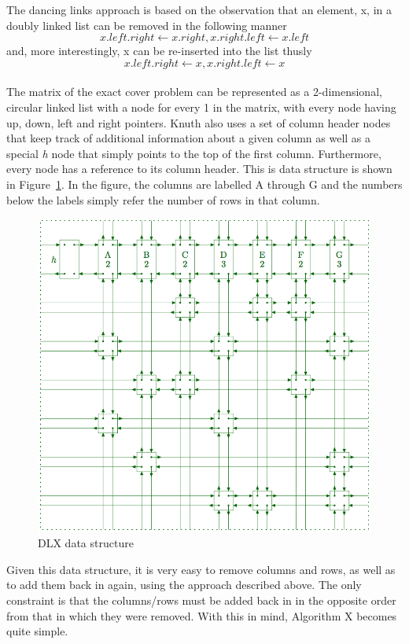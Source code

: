 \documentclass[12pt]{article}
\newcounter{row}
\newcounter{col}
\begin{document}
The dancing links approach is based on the observation that an element, x, in a doubly linked list can be removed in the following manner
\[ x.left.right \gets x.right, x.right.left \gets x.left \]
and, more interestingly, x can be re-inserted into the list thusly
\[ x.left.right \gets x, x.right.left \gets x \]
\\
The matrix of the exact cover problem can be represented as a 2-dimensional, circular linked list with a node for every 1 in the matrix, with every node having up, down, left and right pointers. Knuth also uses a set of column header nodes that keep track of additional information about a given column as well as a special \textit{h} node that simply points to the top of the first column. Furthermore, every node has a reference to its column header. This is data structure is shown in Figure~\ref{dlx}. In the figure, the columns are labelled A through G and the numbers below the labels simply refer the number of rows in that column.
\begin{figure}[H]
\begin{center}
\includegraphics[width=0.9\columnwidth]{dancing_links}
\caption{DLX data structure}
\label{dlx}
\end{center}
\end{figure}
Given this data structure, it is very easy to remove columns and rows, as well as to add them back in again, using the approach described above. The only constraint is that the columns/rows must be added back in in the opposite order from that in which they were removed. With this in mind, Algorithm X becomes quite simple. \\ 
\end{document}
